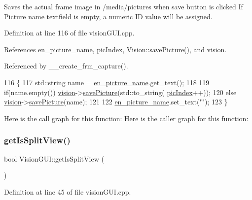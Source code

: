 Saves the actual frame image in /media/pictures when \textquotesingle{}save\textquotesingle{} button is clicked If \textquotesingle{}Picture name\textquotesingle{} textfield is empty, a numeric ID value will be assigned. 



Definition at line 116 of file vision\+G\+U\+I.\+cpp.



References en\+\_\+picture\+\_\+name, pic\+Index, Vision\+::save\+Picture(), and vision.



Referenced by \+\_\+\+\_\+create\+\_\+frm\+\_\+capture().


\begin{DoxyCode}
116                                         \{
117     std::string name = \hyperlink{class_vision_g_u_i_aea52285dc471a5611d8170d162ef3210}{en\_picture\_name}.get\_text();
118 
119     \textcolor{keywordflow}{if}(name.empty()) \hyperlink{class_vision_g_u_i_a36aba058af844ec6cbe0c945c616cd5f}{vision}->\hyperlink{class_vision_a324ad2f355fa414ee484e8ce9b247ffc}{savePicture}(std::to\_string(
      \hyperlink{class_vision_g_u_i_a45478a68d6dcd492aa57b2b4a1f14e32}{picIndex}++));
120     \textcolor{keywordflow}{else} \hyperlink{class_vision_g_u_i_a36aba058af844ec6cbe0c945c616cd5f}{vision}->\hyperlink{class_vision_a324ad2f355fa414ee484e8ce9b247ffc}{savePicture}(name);
121 
122     \hyperlink{class_vision_g_u_i_aea52285dc471a5611d8170d162ef3210}{en\_picture\_name}.set\_text(\textcolor{stringliteral}{""});
123 \}
\end{DoxyCode}
Here is the call graph for this function\+:
Here is the caller graph for this function\+:
\mbox{\label{class_vision_g_u_i_a2d3a0e0b04ac1b80070e9123ec354d83}} 
\subsubsection{\texorpdfstring{get\+Is\+Split\+View()}{getIsSplitView()}}
{\footnotesize\ttfamily bool Vision\+G\+U\+I\+::get\+Is\+Split\+View (\begin{DoxyParamCaption}{ }\end{DoxyParamCaption})}



Definition at line 45 of file vision\+G\+U\+I.\+cpp.



